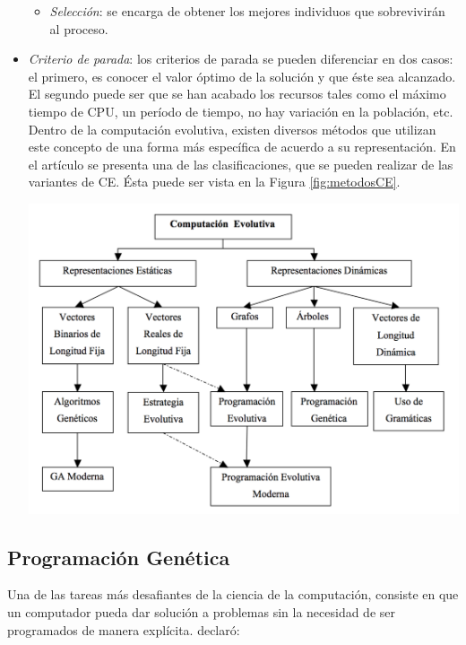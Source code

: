 \begin{itemize}
\begin{itemize}
\item \textit{Selección}: se encarga de obtener los mejores individuos que sobrevivirán al proceso.

\end{itemize}
\item \textit{Criterio de parada}: los criterios de parada se pueden diferenciar en dos casos: el primero, es conocer el valor óptimo de la solución y que éste sea alcanzado. El segundo puede ser que se han acabado los recursos tales como el máximo tiempo de CPU, un período de tiempo, no hay variación en la población, etc. Dentro de la computación evolutiva, existen diversos métodos que utilizan este concepto de una forma más específica de acuerdo a su representación. En el artículo \citep{kouchakpour_2009} se presenta una de las clasificaciones, que se pueden realizar de las variantes de CE. Ésta puede ser vista en la Figura \ref{fig:metodosCE}.

\begingroup
    \centering
    \includegraphics[width=14cm]{images/cap2/metodosCE.png}
    \label{fig:metodosCE}
\endgroup

\end{itemize}


\subsection{Programación Genética}
\label{cap:pg}


Una de las tareas más desafiantes de la ciencia de la computación, consiste en que un computador pueda dar solución a problemas sin la necesidad de ser programados de manera explícita. \cite{samuel1959some} declaró:

